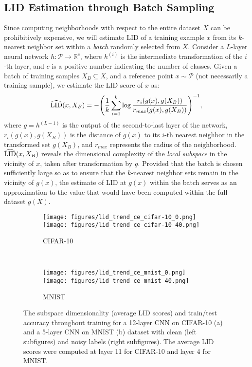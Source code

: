 \documentclass{article}
\begin{document}
\subsection{LID Estimation through Batch Sampling}\label{sec:lid_dnn}
Since computing neighborhoods with respect to the entire dataset $X$ can be prohibitively expensive, we will estimate LID of a training example $x$ from its $k$-nearest neighbor set within a \textit{batch} randomly selected from $X$.   
Consider a $L$-layer neural network $h:\mathcal{P} \rightarrow \mathbb{R}^c $, where $h^{(i)}$ is the intermediate transformation of the $i$-th layer, and $c$ is a positive number indicating the number of classes. Given a batch of training samples $X_{B}\subseteq X$, and a reference point $x \sim \mathcal{P}$ (not necessarily a training sample), we estimate the LID score of $x$ as:
\begin{equation} \label{eq:lid_training}
    \widehat{\textup{LID}}(x, X_B) = - \Bigg( \frac{1}{k}\sum_{i=1}^{k}\log \frac{r_i(g(x), g(X_{B}))}{r_{\mathit{max}}(g(x), g(X_{B}))}\Bigg)^{-1},
\end{equation}
where $g = h^{(L-1)}$ is the output of the second-to-last layer of the network, $r_i(g(x), g(X_{B}))$ is the distance of $g(x)$ to its $i$-th nearest neighbor in the transformed set $g(X_{B})$, and $r_{\mathit{max}}$ represents the radius of the neighborhood. $\widehat{\textup{LID}}(x, X_B)$ reveals the dimensional complexity of the {\em local subspace} in the vicinity of $x$, taken after transformation by $g$. Provided that the batch is chosen sufficiently large so as to ensure that the $k$-nearest neighbor sets remain in the vicinity of $g(x)$, the estimate of LID at $g(x)$ within the batch serves as an approximation to the value that would have been computed within the full dataset $g(X)$. 




\begin{figure}[!t]
\centering
\begin{subfigure}{.5\textwidth}
  \centering
  \texttt{[image: figures/lid\_trend\_ce\_cifar-10\_0.png]}
\texttt{[image: figures/lid\_trend\_ce\_cifar-10\_40.png]}
  \caption{CIFAR-10}
  \label{fig:lid_cifar}
\end{subfigure} \\
\begin{subfigure}{.5\textwidth}
  \centering
  \texttt{[image: figures/lid\_trend\_ce\_mnist\_0.png]}
\texttt{[image: figures/lid\_trend\_ce\_mnist\_40.png]}
  \caption{MNIST}
  \label{fig:lid_mnist}
\end{subfigure}
\caption{The subspace dimensionality (average LID scores) and train/test accuracy throughout training for a 12-layer CNN on CIFAR-10 (a) and a 5-layer CNN on MNIST (b) dataset with clean (left subfigures) and noisy labels (right subfigures). The average LID scores were computed at layer 11 for CIFAR-10 and layer 4 for MNIST.}
\label{fig:lid_trends}
\vspace{-0.2in}
\end{figure}
\end{document}
